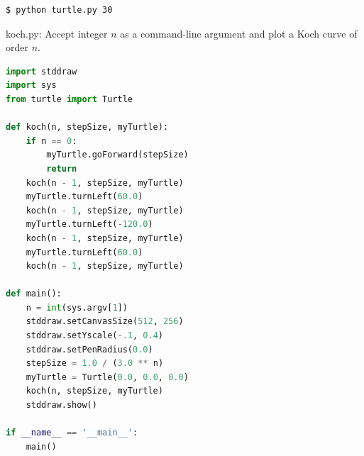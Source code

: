 \documentclass[8pt,a4paper,compress]{beamer}
\begin{document}
\begin{frame}[fragile]
\begin{minipage}{200pt}
\begin{lstlisting}[language={}]
$ python turtle.py 30
\end{lstlisting}
\end{minipage}%
\hfill
\begin{minipage}{100pt}
\begin{center}
\end{center}
\end{minipage}%
\end{frame}

\begin{frame}[fragile]
\pause

\begin{framed}
\tiny koch.py: Accept integer $n$ as a command-line argument and plot a Koch curve of order $n$.
\end{framed}

\begin{lstlisting}[language=Python]
import stddraw
import sys
from turtle import Turtle

def koch(n, stepSize, myTurtle):
    if n == 0:
        myTurtle.goForward(stepSize)
        return  
    koch(n - 1, stepSize, myTurtle)
    myTurtle.turnLeft(60.0)
    koch(n - 1, stepSize, myTurtle)
    myTurtle.turnLeft(-120.0)
    koch(n - 1, stepSize, myTurtle)
    myTurtle.turnLeft(60.0)
    koch(n - 1, stepSize, myTurtle)
 
def main():
    n = int(sys.argv[1])
    stddraw.setCanvasSize(512, 256)
    stddraw.setYscale(-.1, 0.4)
    stddraw.setPenRadius(0.0)
    stepSize = 1.0 / (3.0 ** n)
    myTurtle = Turtle(0.0, 0.0, 0.0)
    koch(n, stepSize, myTurtle)
    stddraw.show()

if __name__ == '__main__':
    main()
\end{lstlisting}
\end{frame}
\end{document}
